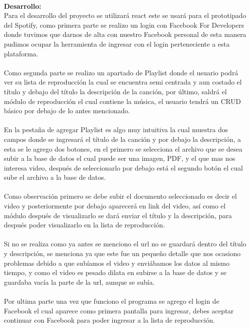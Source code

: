 \documentclass[40pt]{article}
\begin{document}
\maketitle
\textsf{\ \\
\textbf{Desarrollo:}\\
Para el desarrollo del proyecto se utilizará react este se usará para el prototipado del Spotify, como primera parte se realizo un login con Facebook For Developers donde tuvimos que darnos de alta con nuestro Facebook personal de esta manera pudimos ocupar la herramienta de ingresar con el login perteneciente a esta plataforma.
\\
\\
Como segunda parte se realizo un apartado de Playlist donde el usuario podrá ver su lista de reproducción la cual se encuentra semi centrada y aun costado el título y debajo del título la descripción de la canción, por último, saldrá el módulo de reproducción el cual contiene la música, el usuario tendrá un CRUD básico por debajo de lo antes mencionado.
\\
\\
En la pestaña de agregar Playlist es algo muy intuitiva la cual muestra dos campos donde se ingresará el título de la canción y por debajo la descripción, a esta se le agrego dos botones, en el primero se selecciona el archivo que se desea subir a la base de datos el cual puede ser una imagen, PDF, y el que mas nos interesa video, después de seleccionarlo por debajo está el segundo botón el cual sube el archivo a la base de datos.
\\
\\
Como observación primero se debe subir el documento seleccionado es decir el video y posteriormente por debajo aparecerá en link del video, así como el módulo después de visualizarlo se dará enviar el título y la descripción, para después poder visualizarlo en la lista de reproducción.
\\
\\
Si no se realiza como ya antes se menciono el url no se guardará dentro del título y descripción, se menciona ya que este fue un pequeño detalle que nos ocasiono problemas debido a que subíamos el video y enviábamos los datos al mismo tiempo, y como el video es pesado dilata en subirse a la base de datos y se guardaba vacía la parte de la url, aunque se subía.
\\
\\
Por ultima parte una vez que funciono el programa se agrego el login de Facebook el cual aparece como primera pantalla para ingresar, debes aceptar continuar con Facebook para poder ingresar a la lista de reproducción.
\\}
\end{document}
